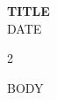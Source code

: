 \documentclass[9pt,a4paper]{book}
\newcommand{\handoutHeader}{%
  \begin{center}
    {\fontsize{15}{19}\selectfont\bfseries\textcolor{mycolor}{ {{TITLE}} }}\\[0.35em]
    {\small\textcolor{mycolor}{ {{DATE}} }}
  \end{center}
  \vspace{0.2em}
}
\begin{document}
\handoutHeader

\begin{multicols}{2}

{{BODY}}

\end{multicols}
\end{document}

